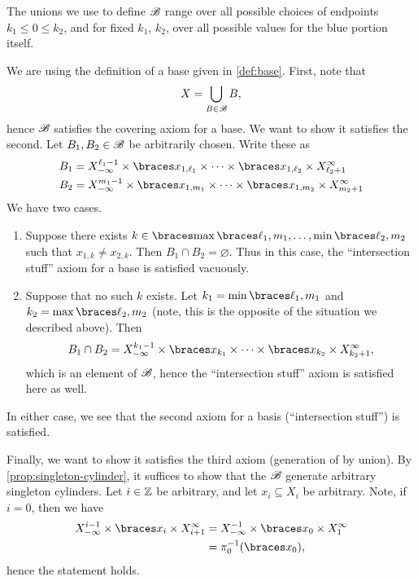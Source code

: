 \documentclass{fkpaper}
\begin{document}
\begin{multicols}{2}
The unions we use to define ${\mathscr{B}}$ range over all possible choices of
endpoints $k_1 \leq 0 \leq k_2$, and for fixed $k_1$, $k_2$, over all
possible values for the blue portion itself.
\begin{sproof}
  We are using the definition of a base given in \cref{def:base}.
  First, note that
  \[
    X = \bigcup_{B \in {\mathscr{B}}} B,
  \]
  hence ${\mathscr{B}}$ satisfies the covering axiom for a base. We want to
  show it satisfies the second. Let $B_1, B_2 \in {\mathscr{B}}$ be
  arbitrarily chosen. Write these as
  \begin{align*}
    B_1
    &= X_{-\infty}^{\ell_1-1}\times \set{x_{1,\ell_1} } \times
      \cdots \times \set{x_{1,\ell_2}} \times X_{\ell_2+1}^\infty \\
    B_2
    &= X_{-\infty}^{m_1-1}\times \set{x_{1,m_1} } \times \cdots \times
      \set{x_{1,m_2}} \times X_{m_2+1}^\infty
  \end{align*}
  We have two cases.
  \begin{enumerate}
    \item Suppose there exists $k \in \set{\max\set{\ell_1, m_1},
      \ldots, \min\set{\ell_2, m_2}}$ such that $x_{1,k} \neq
      x_{2,k}$. Then $B_1 \cap B_2 = \varnothing$. Thus in this case,
      the ``intersection stuff'' axiom for a base is satisfied
      vacuously. \cmark
    \item Suppose that no such $k$ exists. Let $k_1 = \min\set{\ell_1,
      m_1}$ and $k_2 = \max\set{\ell_2, m_2}$ (note, this is the
      opposite of the situation we described above). Then
      \[
      B_1 \cap B_2 = X_{-\infty}^{k_1 - 1} \times \set{x_{k_1}} \times
      \cdots \times \set{x_{k_2}} \times X_{k_2+1}^\infty,
      \]
      which is an element of ${\mathscr{B}}$, hence the ``intersection stuff''
      axiom is satisfied here as well. \cmark
  \end{enumerate}
  In either case, we see that the second axiom for a basis
  (``intersection stuff'') is satisfied.

  Finally, we want to show it satisfies the third axiom (generation of
  by union). By \cref{prop:singleton-cylinder}, it suffices to show
  that the ${\mathscr{B}}$ generate arbitrary singleton cylinders. Let $i \in
  \mathbb{Z}$ be arbitrary, and let $x_i \subseteq X_i$ be arbitrary. Note,
  if $i = 0$, then we have
  \begin{align*}
    X_{-\infty}^{i-1} \times \set{x_i} \times X_{i+1}^{\infty}
    &= X_{-\infty}^{-1} \times \set{x_0} \times X_{1}^{\infty} \\
    &= \pi_{0}^{-1}(\set{x_0}),
  \end{align*}
  hence the statement holds.


\end{sproof}
\end{multicols}
\end{document}
